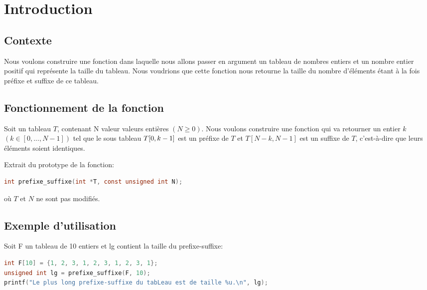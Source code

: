 \section{Introduction}\label{introduction}
\subsection{Contexte}
Nous voulons construire une fonction dans laquelle nous allons passer en argument
un tableau de nombres entiers et un nombre entier positif qui représente la taille du tableau.
Nous voudrions que cette fonction nous retourne la taille du nombre d'éléments
étant à la fois préfixe et suffixe de ce tableau.

\subsection{Fonctionnement de la fonction}
Soit un tableau $T$, contenant N valeur valeurs entières $(N \geq 0)$. Nous 
voulons construire une fonction qui va retourner un entier $k$ $(k \in [0, ...,
 N-1])$ tel que le sous tableau $T[0,\space k-1]$ est un préfixe de $T$ et 
$T[N-k, N-1]$ est un suffixe de $T$, c'est-à-dire que leurs éléments soient
identiques.

Extrait du prototype de la fonction:
\begin{lstlisting}[language=C, caption=Fonction souhaitée]
int prefixe_suffixe(int *T, const unsigned int N);
\end{lstlisting}
où $T$ et $N$ ne sont pas modifiés.

\subsection{Exemple d'utilisation}
Soit F un tableau de 10 entiers et lg contient la taille du prefixe-suffixe:
\begin{lstlisting}[language=C, caption=Exemple d'utilisation]
int F[10] = {1, 2, 3, 1, 2, 3, 1, 2, 3, 1};
unsigned int lg = prefixe_suffixe(F, 10);
printf("Le plus long prefixe-suffixe du tabLeau est de taille %u.\n", lg);
\end{lstlisting}

